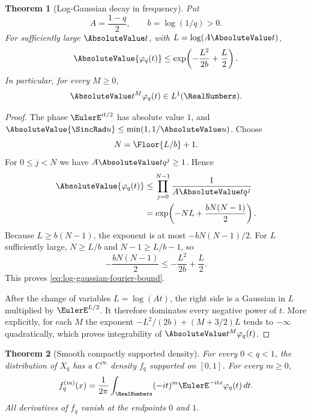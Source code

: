 \documentclass[11pt,a4paper,oneside,openany]{book}
\newtheorem{theorem}{Theorem}[chapter]
\theoremstyle{definition}
\theoremstyle{remark}
\begin{document}
\begin{theorem}[Log-Gaussian decay in frequency]\label{thm:geometric-uniform-fourier-decay}
Put
\[
 A=\frac{1-q}{2},
 \qquad
 b=\log(1/q)>0.
\]
For sufficiently large $\AbsoluteValue t$, with $L=\log(A\AbsoluteValue t)$,
\begin{equation}\label{eq:log-gaussian-fourier-bound}
 \AbsoluteValue{\varphi_q(t)}
 \le \exp\!\left(-\frac{L^2}{2b}+\frac L2\right).
\end{equation}
In particular, for every $M\ge0$,
\[
 \AbsoluteValue t^M\varphi_q(t)\in L^1(\RealNumbers).
\]
\end{theorem}

\begin{proof}
The phase $\EulerE^{it/2}$ has absolute value $1$, and
$\AbsoluteValue{\SincRad u}\le\min(1,1/\AbsoluteValue u)$.  Choose
\[
 N=\Floor{L/b}+1.
\]
For $0\le j<N$ we have $A\AbsoluteValue t q^j\ge1$.  Hence
\begin{align*}
 \AbsoluteValue{\varphi_q(t)}
 &\le\prod_{j=0}^{N-1}\frac1{A\AbsoluteValue t q^j}\\
 &=\exp\!\left(-NL+\frac{bN(N-1)}2\right).
\end{align*}
Because $L\ge b(N-1)$, the exponent is at most
$-bN(N-1)/2$.  For $L$ sufficiently large,
$N\ge L/b$ and $N-1\ge L/b-1$, so
\[
 -\frac{bN(N-1)}2
 \le-\frac{L^2}{2b}+\frac L2.
\]
This proves \eqref{eq:log-gaussian-fourier-bound}.

After the change of variables $L=\log(A t)$, the right side is a Gaussian in $L$ multiplied by $\EulerE^{L/2}$.  It therefore dominates every negative power of $t$.  More explicitly, for each $M$ the exponent
$-L^2/(2b)+(M+3/2)L$ tends to $-\infty$ quadratically, which proves integrability of $\AbsoluteValue t^M\varphi_q(t)$.
\end{proof}

\begin{theorem}[Smooth compactly supported density]\label{thm:geometric-uniform-smooth-density}
For every $0<q<1$, the distribution of $X_q$ has a $C^\infty$ density $f_q$ supported on $[0,1]$.  For every $m\ge0$,
\begin{equation}\label{eq:geometric-uniform-density-fourier}
 f_q^{(m)}(x)
 =\frac1{2\pi}\int_{\RealNumbers}(-it)^m \EulerE^{-itx}\varphi_q(t)\,dt.
\end{equation}
All derivatives of $f_q$ vanish at the endpoints $0$ and $1$.
\end{theorem}
\end{document}
